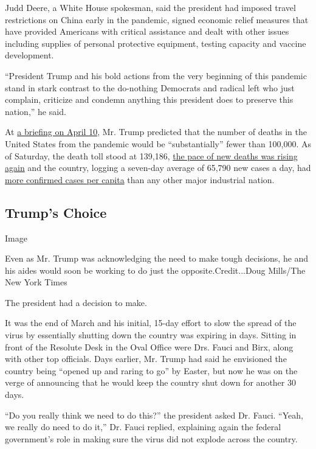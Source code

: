 Judd Deere, a White House spokesman, said the president had imposed
travel restrictions on China early in the pandemic, signed economic
relief measures that have provided Americans with critical assistance
and dealt with other issues including supplies of personal protective
equipment, testing capacity and vaccine development.

``President Trump and his bold actions from the very beginning of this
pandemic stand in stark contrast to the do-nothing Democrats and radical
left who just complain, criticize and condemn anything this president
does to preserve this nation,'' he said.

At
\href{https://www.whitehouse.gov/briefings-statements/remarks-president-trump-vice-president-pence-members-coronavirus-task-force-press-briefing-24/}{a
briefing on April 10}, Mr. Trump predicted that the number of deaths in
the United States from the pandemic would be ``substantially'' fewer
than 100,000. As of Saturday, the death toll stood at 139,186,
\href{https://www.nytimes.com/interactive/2020/07/17/us/coronavirus-deaths.html}{the
pace of new deaths was rising again} and the country, logging a
seven-day average of 65,790 new cases a day, had
\href{https://www.nytimes.com/interactive/2020/world/coronavirus-maps.html}{more
confirmed cases per capita} than any other major industrial nation.

\hypertarget{trumps-choice}{%
\subsection{Trump's Choice}\label{trumps-choice}}

Image

Even as Mr. Trump was acknowledging the need to make tough decisions, he
and his aides would soon be working to do just the
opposite.Credit...Doug Mills/The New York Times

The president had a decision to make.

It was the end of March and his initial, 15-day effort to slow the
spread of the virus by essentially shutting down the country was
expiring in days. Sitting in front of the Resolute Desk in the Oval
Office were Drs. Fauci and Birx, along with other top officials. Days
earlier, Mr. Trump had said he envisioned the country being ``opened up
and raring to go'' by Easter, but now he was on the verge of announcing
that he would keep the country shut down for another 30 days.

``Do you really think we need to do this?'' the president asked Dr.
Fauci. ``Yeah, we really do need to do it,'' Dr. Fauci replied,
explaining again the federal government's role in making sure the virus
did not explode across the country.

